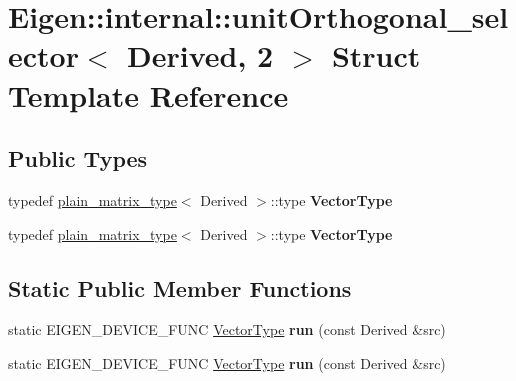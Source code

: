 \hypertarget{struct_eigen_1_1internal_1_1unit_orthogonal__selector_3_01_derived_00_012_01_4}{}\section{Eigen\+:\+:internal\+:\+:unit\+Orthogonal\+\_\+selector$<$ Derived, 2 $>$ Struct Template Reference}
\label{struct_eigen_1_1internal_1_1unit_orthogonal__selector_3_01_derived_00_012_01_4}
\subsection*{Public Types}
\begin{DoxyCompactItemize}
\item 
\mbox{\label{struct_eigen_1_1internal_1_1unit_orthogonal__selector_3_01_derived_00_012_01_4_aeb08f2f9f5e1b2f74a06f1dc74e7ce08}} 
typedef \hyperlink{struct_eigen_1_1internal_1_1plain__matrix__type}{plain\+\_\+matrix\+\_\+type}$<$ Derived $>$\+::type {\bfseries Vector\+Type}
\item 
\mbox{\label{struct_eigen_1_1internal_1_1unit_orthogonal__selector_3_01_derived_00_012_01_4_aeb08f2f9f5e1b2f74a06f1dc74e7ce08}} 
typedef \hyperlink{struct_eigen_1_1internal_1_1plain__matrix__type}{plain\+\_\+matrix\+\_\+type}$<$ Derived $>$\+::type {\bfseries Vector\+Type}
\end{DoxyCompactItemize}
\subsection*{Static Public Member Functions}
\begin{DoxyCompactItemize}
\item 
\mbox{\label{struct_eigen_1_1internal_1_1unit_orthogonal__selector_3_01_derived_00_012_01_4_a92196490f555a41b42aeb6165ac1bf9b}} 
static E\+I\+G\+E\+N\+\_\+\+D\+E\+V\+I\+C\+E\+\_\+\+F\+U\+NC \hyperlink{struct_vector_type}{Vector\+Type} {\bfseries run} (const Derived \&src)
\item 
\mbox{\label{struct_eigen_1_1internal_1_1unit_orthogonal__selector_3_01_derived_00_012_01_4_a92196490f555a41b42aeb6165ac1bf9b}} 
static E\+I\+G\+E\+N\+\_\+\+D\+E\+V\+I\+C\+E\+\_\+\+F\+U\+NC \hyperlink{struct_vector_type}{Vector\+Type} {\bfseries run} (const Derived \&src)
\end{DoxyCompactItemize}


